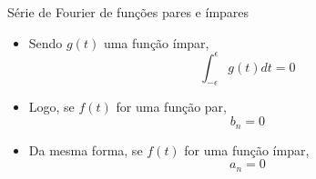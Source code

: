       \begin{slide}[toc=]{Série de Fourier de funções pares e ímpares}
	      {
		      \begin{itemize}
			      \item Sendo $g(t)$ uma \alert{função ímpar},
				      \begin{equation*}
					      \int_{-\epsilon}^\epsilon g(t) dt = 0
				      \end{equation*}
			      \item Logo, se $f(t)$ for uma função par, 
				      \begin{equation*}
					      b_n = 0
				      \end{equation*}
			      \item Da mesma forma, se $f(t)$ for uma função ímpar, 
				      \begin{equation*}
					      a_n = 0
				      \end{equation*}
		      \end{itemize}
	      }

      \end{slide}

